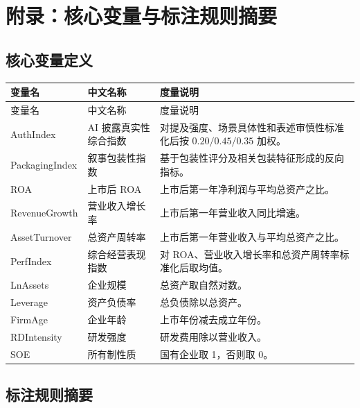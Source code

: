 \section{附录：核心变量与标注规则摘要}

\subsection{核心变量定义}

\begin{longtable} {p{3cm}p{4cm}p{7cm}}
    \toprule
    变量名            & 中文名称         & 度量说明                                        \\
    \midrule
    \endfirsthead
    \toprule
    变量名            & 中文名称         & 度量说明                                        \\
    \midrule
    \endhead
    AuthIndex      & AI 披露真实性综合指数 & 对提及强度、场景具体性和表述审慎性标准化后按 $0.20/0.45/0.35$ 加权。 \\
    PackagingIndex & 叙事包装性指数      & 基于包装性评分及相关包装特征形成的反向指标。                      \\
    ROA            & 上市后 ROA      & 上市后第一年净利润与平均总资产之比。                          \\
    RevenueGrowth  & 营业收入增长率      & 上市后第一年营业收入同比增速。                             \\
    AssetTurnover  & 总资产周转率       & 上市后第一年营业收入与平均总资产之比。                         \\
    PerfIndex      & 综合经营表现指数     & 对 ROA、营业收入增长率和总资产周转率标准化后取均值。                \\
    LnAssets       & 企业规模         & 总资产取自然对数。                                   \\
    Leverage       & 资产负债率        & 总负债除以总资产。                                   \\
    FirmAge        & 企业年龄         & 上市年份减去成立年份。                                 \\
    RDIntensity    & 研发强度         & 研发费用除以营业收入。                                 \\
    SOE            & 所有制性质        & 国有企业取 1，否则取 0。                              \\
    \bottomrule
\end{longtable}

\subsection{标注规则摘要}

